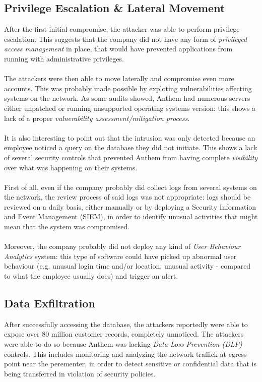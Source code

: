 	\subsection{Privilege Escalation \& Lateral Movement}
	After the first initial compromise, the attacker was able to perform privilege escalation. This suggests that the company did not have any form of \textit{privileged access management} in place, that would have prevented applications from running with administrative privileges.\\\\ %
	The attackers were then able to move laterally and compromise even more accounts. This was probably made possible by exploting vulnerabilities affecting systems on the network. As some audits \cite{anthemAuditReport} showed, Anthem had numerous servers either unpatched or running unsupported operating systems version: this shows a lack of a proper \textit{vulnerability assessment/mitigation process}.\\\\ %
	It is also interesting to point out that the intrusion was only detected because an employee noticed a query on the database they did not initiate. This shows a lack of several security controls that prevented Anthem from having complete \textit{visibility} over what was happening on their systems.\\\\First of all, even if the company probably did collect logs from several systems on the network, the review process of said logs was not appropriate: logs should be reviewed on a daily basis, either manually or by deploying a Security Information and Event Management (SIEM), in order to identify unusual activities that might mean that the system was compromised.\\\\
	Moreover, the company probably did not deploy any kind of \textit{User Behaviour Analytics} system: this type of software could have picked up abnormal user behaviour (e.g. unusual login time and/or location, unusual activity - compared to what the employee usually does) and trigger an alert.
	\subsection{Data Exfiltration}
	After successfully accessing the database, the attackers reportedly were able to expose over 80 million customer records, completely unnoticed. The attackers were able to do so because Anthem was lacking \textit{Data Loss Prevention (DLP)} controls. This includes monitoring and analyzing the network traffick at egress point near the perementer, in order to detect sensitive or confidential data that is being transferred in violation of security policies.
